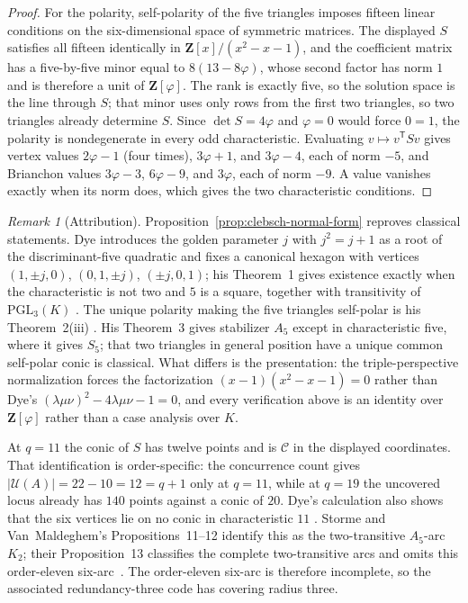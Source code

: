 \documentclass[11pt]{article}
\theoremstyle{definition}
\theoremstyle{remark}
\newtheorem{remark}[theorem]{Remark}
\newcommand{\cC}{\mathcal{C}}
\newcommand{\cU}{\mathcal{U}}
\begin{document}
\begin{proof}
For the polarity, self-polarity of the five triangles imposes fifteen
linear conditions on the six-dimensional space of symmetric matrices.  The
displayed $S$ satisfies all fifteen identically in
$\mathbf Z[x]/(x^2-x-1)$, and the coefficient matrix has a five-by-five
minor equal to $8(13-8\varphi)$, whose second factor has norm $1$ and is
therefore a unit of $\mathbf Z[\varphi]$.  The rank is exactly five, so the
solution space is the line through $S$; that minor uses only rows from the
first two triangles, so two triangles already determine $S$.  Since
$\det S=4\varphi$ and $\varphi=0$ would force $0=1$, the polarity is
nondegenerate in every odd characteristic.  Evaluating $v\mapsto
v^{\mathsf T}Sv$ gives vertex values $2\varphi-1$ (four times), $3\varphi+1$,
and $3\varphi-4$, each of norm $-5$, and Brianchon values $3\varphi-3$,
$6\varphi-9$, and $3\varphi$, each of norm $-9$.  A value vanishes exactly
when its norm does, which gives the two characteristic conditions.
\end{proof}

\begin{remark}[Attribution]
Proposition~\ref{prop:clebsch-normal-form} reproves classical statements.
Dye introduces the golden parameter $j$ with $j^2=j+1$ as a root of the
discriminant-five quadratic and fixes a canonical hexagon with vertices
$(1,\pm j,0)$, $(0,1,\pm j)$, $(\pm j,0,1)$; his Theorem~1 gives existence
exactly when the characteristic is not two and $5$ is a square, together
with transitivity of $\mathrm{PGL}_3(K)$
\cite[\S2.2, Theorem~1, pp.~274--276]{Dye1991}.  The unique polarity making
the five triangles self-polar is his Theorem~2(iii)
\cite[pp.~277--278]{Dye1991}. His Theorem~3 gives stabilizer $A_5$ except
in characteristic five, where it gives $S_5$\cite[p.~278]{Dye1991}; that
two triangles in general position have a
unique common self-polar conic is classical.  What differs is the
presentation: the triple-perspective normalization forces the factorization
$(x-1)(x^2-x-1)=0$ rather than Dye's
$(\lambda\mu\nu)^2-4\lambda\mu\nu-1=0$, and every verification above is an
identity over $\mathbf Z[\varphi]$ rather than a case analysis over $K$.
\end{remark}

At $q=11$ the conic of $S$ has twelve points and is $\cC$ in the displayed
coordinates.  That identification is order-specific: the concurrence count
gives $|\cU(A)|=22-10=12=q+1$ only at $q=11$, while at $q=19$ the uncovered
locus already has $140$ points against a conic of $20$.  Dye's calculation
also shows that the six
vertices lie on no conic in characteristic $11$
\cite[Theorem~2, pp.~277--278; p.~281]{Dye1991}. Storme and Van~Maldeghem's
Propositions~11--12 identify this as the two-transitive $A_5$-arc $K_2$;
their Proposition~13 classifies the complete two-transitive arcs and omits
this order-eleven six-arc~\cite[Props.~11--13]{SVM1995}. The order-eleven
six-arc is therefore incomplete, so the associated redundancy-three code has
covering radius three.
\end{document}
